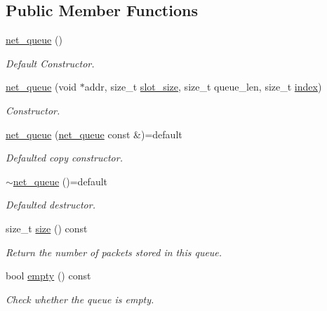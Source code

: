 \subsection*{Public Member Functions}
\begin{DoxyCompactItemize}
\item 
\hyperlink{classpfq_1_1net__queue_a1306ad9a1587c85ac3bafc552667a578}{net\+\_\+queue} ()
\begin{DoxyCompactList}\small\item\em Default Constructor. \end{DoxyCompactList}\item 
\hyperlink{classpfq_1_1net__queue_a3e98f8f2ae6dfd4a0e7d28734601d307}{net\+\_\+queue} (void $\ast$addr, size\+\_\+t \hyperlink{classpfq_1_1net__queue_a9f745871293123f417a492aa861c13cc}{slot\+\_\+size}, size\+\_\+t queue\+\_\+len, size\+\_\+t \hyperlink{classpfq_1_1net__queue_ab33bdebd885e677a3e079c0193624e52}{index})
\begin{DoxyCompactList}\small\item\em Constructor. \end{DoxyCompactList}\item 
\hyperlink{classpfq_1_1net__queue_a71df078739d1e6a0817ac8bde9fa6f7a}{net\+\_\+queue} (\hyperlink{classpfq_1_1net__queue}{net\+\_\+queue} const \&)=default
\begin{DoxyCompactList}\small\item\em Defaulted copy constructor. \end{DoxyCompactList}\item 
\hyperlink{classpfq_1_1net__queue_a87fd3585cac30773e7f5ff6951e74957}{$\sim$net\+\_\+queue} ()=default
\begin{DoxyCompactList}\small\item\em Defaulted destructor. \end{DoxyCompactList}\item 
size\+\_\+t \hyperlink{classpfq_1_1net__queue_a3c7e453d47e5493300312c0359e1497b}{size} () const 
\begin{DoxyCompactList}\small\item\em Return the number of packets stored in this queue. \end{DoxyCompactList}\item 
bool \hyperlink{classpfq_1_1net__queue_a3e59c334176f5910f4a204965d4442b9}{empty} () const 
\begin{DoxyCompactList}\small\item\em Check whether the queue is empty. \end{DoxyCompactList}\item 

\end{DoxyCompactItemize}
